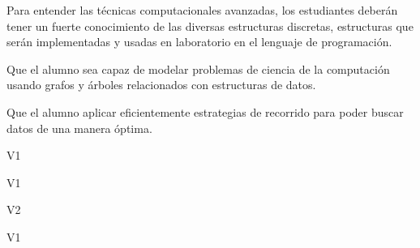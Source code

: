 \begin{syllabus}


\begin{justification}
Para entender las técnicas computacionales avanzadas, los estudiantes deberán tener un fuerte conocimiento de las
diversas estructuras discretas, estructuras que serán implementadas y usadas en laboratorio en el lenguaje de programación.
\end{justification}

\begin{goals}
\item Que el alumno sea capaz de modelar problemas de ciencia de la computación usando grafos y árboles relacionados con estructuras de datos.
\item Que el alumno aplicar eficientemente estrategias de recorrido para poder buscar datos de una manera óptima.
\end{goals}

\begin{outcomes}{V1}
    \item {}
    \item {}
    \item {}
    \item {}
    \item {}
\end{outcomes}

\begin{specificoutcomes}{V1}
    \item {}
    \item {}
    \item {}
    \item {}
    \item {}
\end{specificoutcomes}

\begin{outcomes}{V2}
    \item {} 
    \item {} 
\end{outcomes}

\begin{competences}{V1}
    \item {}
    \item {}
    \item {}
    \item {}
    \item {}
    \item {}
\end{competences}


\end{syllabus}
